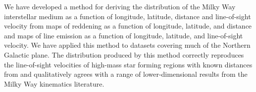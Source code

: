 We have developed a method for deriving the distribution of the Milky Way interstellar medium as a function of longitude, latitude, distance and line-of-sight velocity from maps of reddening as a function of longitude, latitude, and distance and maps of line emission as a function of longitude, latitude, and line-of-sight velocity. 
We have applied this method to datasets covering much of the Northern Galactic plane.
The distribution produced by this method correctly reproduces the line-of-sight velocities of high-mass star forming regions with known distances from \citet{Reid:2014km} and qualitatively agrees with a range of lower-dimensional results from the Milky Way kinematics literature.
